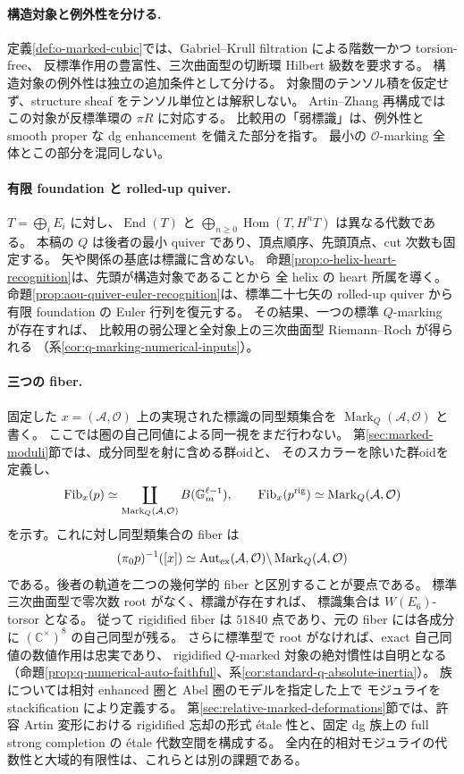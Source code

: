 \documentclass[11pt,a4paper]{ltjsarticle}
\theoremstyle{definition}\newtheorem{remark}[theorem]{注意}
\newcommand{\Hom}{\operatorname{Hom}}\newcommand{\HH}{\operatorname{HH}}
\newcommand{\OO}{\mathcal O}\newcommand{\rank}{\operatorname{rank}}
\newcommand{\End}{\operatorname{End}}\newcommand{\RHom}{\operatorname{RHom}}
\begin{document}
\paragraph{構造対象と例外性を分ける.}
定義\ref{def:o-marked-cubic}では、Gabriel--Krull filtration による階数一かつ torsion-free、
反標準作用の豊富性、三次曲面型の切断環 Hilbert 級数を要求する。
構造対象の例外性は独立の追加条件として分ける。
対象間のテンソル積を仮定せず、structure sheaf をテンソル単位とは解釈しない。
Artin--Zhang 再構成ではこの対象が反標準環の $\pi R$ に対応する。
比較用の「弱標識」は、例外性と smooth proper な dg enhancement を備えた部分を指す。
最小の $\mathcal O$-marking 全体とこの部分を混同しない。

\paragraph{有限 foundation と rolled-up quiver.}
$T=\bigoplus_iE_i$ に対し、$\End(T)$ と
$\bigoplus_{n\ge0}\Hom(T,H^nT)$ は異なる代数である。
本稿の $Q$ は後者の最小 quiver であり、頂点順序、先頭頂点、cut 次数も固定する。
矢や関係の基底は標識に含めない。
命題\ref{prop:o-helix-heart-recognition}は、先頭が構造対象であることから
全 helix の heart 所属を導く。
命題\ref{prop:aou-quiver-euler-recognition}は、標準二十七矢の rolled-up quiver から
有限 foundation の Euler 行列を復元する。
その結果、一つの標準 $Q$-marking が存在すれば、
比較用の弱公理と全対象上の三次曲面型 Riemann--Roch が得られる
（系\ref{cor:q-marking-numerical-inputs}）。

\paragraph{三つの fiber.}
固定した $x=(\mathcal A,\OO)$ 上の実現された標識の同型類集合を
$\operatorname{Mark}_Q(\mathcal A,\OO)$ と書く。
ここでは圏の自己同値による同一視をまだ行わない。
第\ref{sec:marked-moduli}節では、成分同型を射に含める群oidと、
そのスカラーを除いた群oidを定義し、
\[
 \operatorname{Fib}_x(p)\simeq
 \coprod_{\operatorname{Mark}_Q(\mathcal A,\OO)}B(\mathbb G_m^{\ell-1}),
 \qquad
 \operatorname{Fib}_x(p^{\rm rig})\simeq
 \operatorname{Mark}_Q(\mathcal A,\OO)
\]
を示す。これに対し同型類集合の fiber は
\[
 (\pi_0p)^{-1}([x])\simeq
 \operatorname{Aut}_{\rm ex}(\mathcal A,\OO)
 \backslash\operatorname{Mark}_Q(\mathcal A,\OO)
\]
である。後者の軌道を二つの幾何学的 fiber と区別することが要点である。
標準三次曲面型で零次数 root がなく、標識が存在すれば、
標識集合は $W(E_6)$-torsor となる。
従って rigidified fiber は $51840$ 点であり、元の fiber には各成分に
$(\mathbb C^\times)^8$ の自己同型が残る。
さらに標準型で root がなければ、exact 自己同値の数値作用は忠実であり、
rigidified $Q$-marked 対象の絶対慣性は自明となる
（命題\ref{prop:q-numerical-auto-faithful}、系\ref{cor:standard-q-absolute-inertia}）。
族については相対 enhanced 圏と Abel 圏のモデルを指定した上で
モジュライを stackification により定義する。
第\ref{sec:relative-marked-deformations}節では、許容 Artin 変形における
rigidified 忘却の形式 \'etale 性と、固定 dg 族上の full strong completion の
\'etale 代数空間を構成する。
全内在的相対モジュライの代数性と大域的有限性は、これらとは別の課題である。
\end{document}
